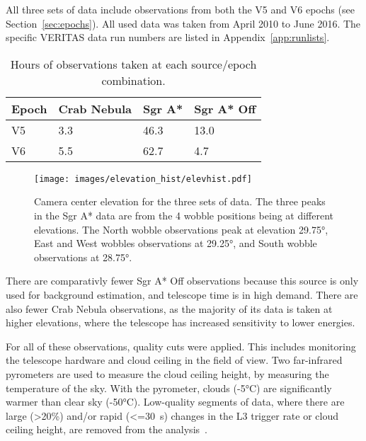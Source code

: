   All three sets of data include observations from both the V5 and V6 epochs (see Section~\ref{sec:epochs}).
  All used data was taken from April 2010 to June 2016.
  The specific VERITAS data run numbers are listed in Appendix~\ref{app:runlists}.

  \begin{table}[!ht]
    \centering
    \caption{Hours of observations taken at each source/epoch combination.}
    \label{tab:observation_times}
    \begin{tabular}{|l|l|l|l|}
      \hline
      \textbf{Epoch} & \textbf{Crab Nebula} & \textbf{Sgr A*} & \textbf{Sgr A* Off} \\ \hline
      V5             & 3.3                  & 46.3            & 13.0                \\ \hline
      V6             & 5.5                  & 62.7            & 4.7                 \\ \hline
    \end{tabular}
  \end{table}


  \begin{figure}[!ht]
    \centering
    \texttt{[image: images/elevation\_hist/elevhist.pdf]}
    \caption[VERITAS Data Elevation Exposure]{
      Camera center elevation for the three sets of data.
      The three peaks in the Sgr A* data are from the 4 wobble positions being at different elevations.
      The North wobble observations peak at elevation \nicetilde\ang{29.75}, East and West wobbles observations at \nicetilde\ang{29.25}, and South wobble observations at \nicetilde\ang{28.75}.
    }
    \label{fig:datapointingelevations}
  \end{figure}

  There are comparativly fewer Sgr A* Off observations because this source is only used for background estimation, and telescope time is in high demand.
  There are also fewer Crab Nebula observations, as the majority of its data is taken at higher elevations, where the telescope has increased sensitivity to lower energies.
  
  For all of these observations, quality cuts were applied.
  This includes monitoring the telescope hardware and cloud ceiling in the field of view.
  Two far-infrared pyrometers are used to measure the cloud ceiling height, by measuring the temperature of the sky.
  With the pyrometer, clouds (\nicetilde\ang{-5}C) are significantly warmer than clear sky (\nicetilde\ang{-50}C).
  Low-quality segments of data, where there are large (>20\%) and/or rapid (<=\SI{30}{s}) changes in the L3 trigger rate or cloud ceiling height, are removed from the analysis~\cite{bird_weather}.


